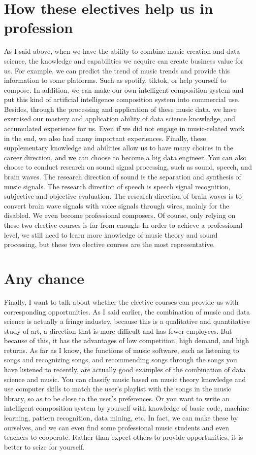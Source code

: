 \documentclass{article}
\begin{document}
\section{How these electives help us in profession}
As I said above, when we have the ability to combine music creation and data science, the knowledge and capabilities we acquire can create business value for us. For example, we can predict the trend of music trends and provide this information to some platforms. Such as spotify, tiktok, or help yourself to compose. In addition, we can make our own intelligent composition system and put this kind of artificial intelligence composition system into commercial use. Besides, through the processing and application of these music data, we have exercised our mastery and application ability of data science knowledge, and accumulated experience for us. Even if we did not engage in music-related work in the end, we also had many important experiences. Finally, these supplementary knowledge and abilities allow us to have many choices in the career direction, and we can choose to become a big data engineer. You can also choose to conduct research on sound signal processing, such as sound, speech, and brain waves. The research direction of sound is the separation and synthesis of music signals. The research direction of speech is speech signal recognition, subjective and objective evaluation. The research direction of brain waves is to convert brain wave signals with voice signals through wires, mainly for the disabled. We even become professional composers. Of course, only relying on these two elective courses is far from enough. In order to achieve a professional level, we still need to learn more knowledge of music theory and sound processing, but these two elective courses are the most representative.
\section{Any chance}
Finally, I want to talk about whether the elective courses can provide us with corresponding opportunities. As I said earlier, the combination of music and data science is actually a fringe industry, because this is a qualitative and quantitative study of art, a direction that is more difficult and has fewer employees. But because of this, it has the advantages of low competition, high demand, and high returns. As far as I know, the functions of music software, such as listening to songs and recognizing songs, and recommending songs through the songs you have listened to recently, are actually good examples of the combination of data science and music. You can classify music based on music theory knowledge and use computer skills to match the user’s playlist with the songs in the music library, so as to be close to the user’s preferences. Or you want to write an intelligent composition system by yourself with knowledge of basic code, machine learning, pattern recognition, data mining, etc. In fact, we can make these by ourselves, and we can even find some professional music students and even teachers to cooperate. Rather than expect others to provide opportunities, it is better to seize for yourself.
\end{document}
